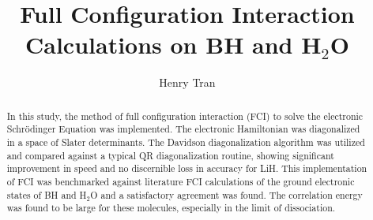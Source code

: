 \documentclass[final,3p,times,twocolumn]{elsarticle}
\begin{document}
\begin{frontmatter}



\title{Full Configuration Interaction Calculations on BH and H$_2$O}


\author{Henry Tran}

\address{Department of Chemistry, Lensfield Road, Cambridge, UK,
CB2 1EW}

\begin{abstract}
In this study, the method of full configuration interaction (FCI) to solve the electronic Schr\"{o}dinger Equation was implemented. The electronic Hamiltonian was diagonalized in a space of Slater determinants. The Davidson diagonalization algorithm was utilized and compared against a typical QR diagonalization routine, showing significant improvement in speed and no discernible loss in accuracy for LiH. This implementation of FCI was benchmarked against literature FCI calculations of the ground electronic states of BH and H$_2$O and a satisfactory agreement was found. The correlation energy was found to be large for these molecules, especially in the limit of dissociation.
\end{abstract}

\end{frontmatter}


\end{document}
